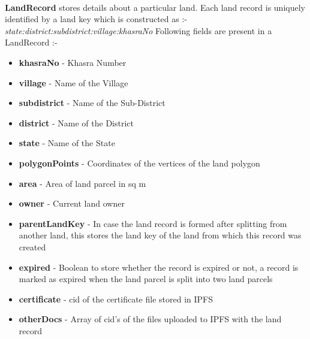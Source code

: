 \documentclass{article}
\begin{document}
        \paragraph{}
        \textbf{LandRecord} stores details about a particular land. Each land record is uniquely identified by a land key which is constructed as :-
        \textit{state:district:subdistrict:village:khasraNo}
        Following fields are present in a LandRecord :-
        \begin{itemize}
            \item \textbf{khasraNo} - Khasra Number
            \item \textbf{village} - Name of the Village
            \item \textbf{subdistrict} - Name of the Sub-District
            \item \textbf{district} - Name of the District
            \item \textbf{state} - Name of the State
            \item \textbf{polygonPoints} - Coordinates of the vertices of the land polygon
            \item \textbf{area} - Area of land parcel in sq m
            \item \textbf{owner} - Current land owner
            \item \textbf{parentLandKey} - In case the land record is formed after splitting from another land, this stores the land key of the land from which this record was created
            \item \textbf{expired} - Boolean to store whether the record is expired or not, a record is marked as expired when the land parcel is split into two land parcels
            \item \textbf{certificate} - \gls{cid} of the certificate file stored in IPFS
            \item \textbf{otherDocs} - Array of \gls{cid}'s of the files uploaded to IPFS with the land record
        \end{itemize}
\end{document}
